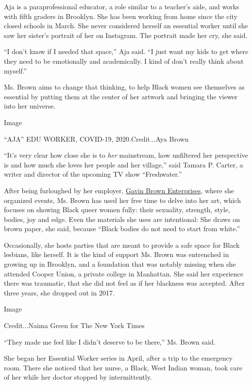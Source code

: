 Aja is a paraprofessional educator, a role similar to a teacher's aide,
and works with fifth graders in Brooklyn. She has been working from home
since the city closed schools in March. She never considered herself an
essential worker until she saw her sister's portrait of her on
Instagram. The portrait made her cry, she said.

``I don't know if I needed that space,'' Aja said. ``I just want my kids
to get where they need to be emotionally and academically. I kind of
don't really think about myself.''

Ms. Brown aims to change that thinking, to help Black women see
themselves as essential by putting them at the center of her artwork and
bringing the viewer into her universe.

Image

``AJA'' EDU WORKER, COVID-19, 2020.Credit...Aya Brown

``It's very clear how close she is to \emph{her} mainstream, how
unfiltered her perspective is and how much she loves her people and her
village,'' said Tamara P. Carter, a writer and director of the upcoming
TV show ``Freshwater.''

After being furloughed by her employer,
\href{https://gavinbrown.biz/}{Gavin Brown Enterprises}, where she
organized events, Ms. Brown has used her free time to delve into her
art, which focuses on showing Black queer women fully: their sexuality,
strength, style, bodies, joy and edge. Even the materials she uses are
intentional: She draws on brown paper, she said, because ``Black bodies
do not need to start from white.''

Occasionally, she hosts parties that are meant to provide a safe space
for Black lesbians, like herself. It is the kind of support Ms. Brown
was entrenched in growing up in Brooklyn, and a foundation that was
notably missing when she attended Cooper Union, a private college in
Manhattan. She said her experience there was traumatic, that she did not
feel as if her blackness was accepted. After three years, she dropped
out in 2017.

Image

Credit...Naima Green for The New York Times

``They made me feel like I didn't deserve to be there,'' Ms. Brown said.

She began her Essential Worker series in April, after a trip to the
emergency room. There she noticed that her nurse, a Black, West Indian
woman, took care of her while her doctor stopped by intermittently.

